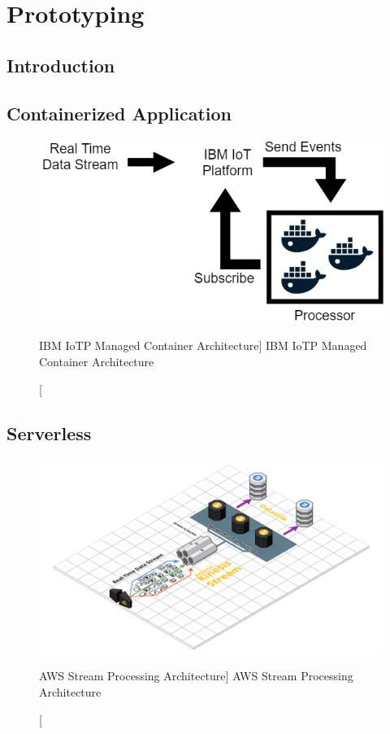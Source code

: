\chapter{Prototyping}


\section{Introduction}

\section{Containerized Application}

\begin{figure}[ht]
    \includegraphics[width=0.6\linewidth]{images/streaming/containerArch.png}\centering
    \caption
    [IBM IoTP Managed Container Architecture]
    {IBM IoTP Managed Container Architecture}
    \label{fig:iotpManagedContainer}
\end{figure}


\section{Serverless}

\begin{figure}[ht]
    \includegraphics[width=\linewidth]{images/streaming/streamingaws.png}\centering
    \caption
    [AWS Stream Processing Architecture]
    {AWS Stream Processing Architecture}
    \label{fig:awsStreamingArchitecture}
\end{figure}


